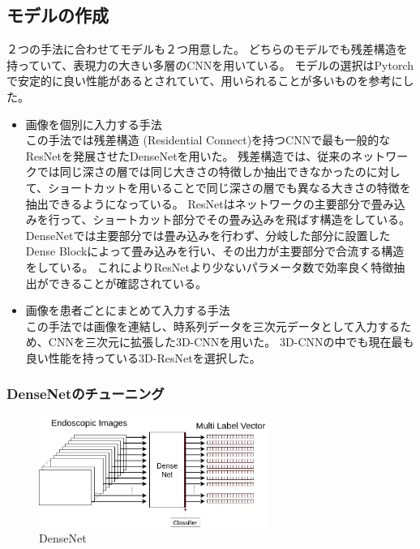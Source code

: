 \subsection{モデルの作成}
２つの手法に合わせてモデルも２つ用意した。
どちらのモデルでも残差構造を持っていて、表現力の大きい多層のCNNを用いている。
モデルの選択はPytorchで安定的に良い性能があるとされていて、用いられることが多いものを参考にした。
\begin{itemize}
    \item 画像を個別に入力する手法\\
この手法では残差構造 (Residential Connect)を持つCNN\cite{CNN}で最も一般的なResNet\cite{ResNet}を発展させたDenseNet\cite{DenseNet}を用いた。
残差構造では、従来のネットワークでは同じ深さの層では同じ大きさの特徴しか抽出できなかったのに対して、ショートカットを用いることで同じ深さの層でも異なる大きさの特徴を抽出できるようになっている。
ResNet\cite{ResNet}はネットワークの主要部分で畳み込みを行って、ショートカット部分でその畳み込みを飛ばす構造をしている。
DenseNet\cite{DenseNet}では主要部分では畳み込みを行わず、分岐した部分に設置したDense Blockによって畳み込みを行い、その出力が主要部分で合流する構造をしている。
これによりResNet\cite{ResNet}より少ないパラメータ数で効率良く特徴抽出ができることが確認されている。
    \item 画像を患者ごとにまとめて入力する手法\\
この手法では画像を連結し、時系列データを三次元データとして入力するため、CNNを三次元に拡張した3D-CNNを用いた。
3D-CNNの中でも現在最も良い性能を持っている3D-ResNet\cite{3D_ResNet}を選択した。
\end{itemize}

\subsubsection{DenseNetのチューニング}

\begin{figure}[tb]
    \begin{center}
        \includegraphics[width=75mm]{./fig/ieice2.png}
        \caption{DenseNet}
        \label{fig:densenet}
    \end{center}
\end{figure}


